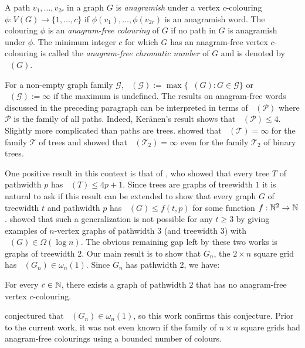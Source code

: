\documentclass{patmorin}
\DeclareMathOperator{\afcn}{\dot{\chi}_\pi}
\begin{document}
A path $v_1,\ldots,v_{2r}$ in a graph $G$ is \emph{anagramish} under a vertex $c$-colouring $\phi:V(G)\to\{1,\ldots,c\}$ if $\phi(v_1),\ldots,\phi(v_{2r})$ is an anagramish word.  The colouring $\phi$ is an \emph{anagram-free colouring} of $G$ if no path in $G$ is anagramish under $\phi$.  The minimum integer $c$ for which $G$ has an anagram-free vertex $c$-colouring is called the \emph{anagram-free chromatic number} of $G$ and is denoted by $\afcn(G)$.

For a non-empty graph family $\mathcal{G}$, $\afcn(\mathcal{G}):=\max\{\afcn(G):G\in\mathcal{G}\}$ or $\afcn(\mathcal{G}):=\infty$ if the maximum is undefined. The results on anagram-free words discussed in the preceding paragraph can be interpreted in terms of $\afcn(\mathcal{P})$ where $\mathcal{P}$ is the family of all paths. Indeed, Ker\"anen's result shows that $\afcn(\mathcal{P})\le 4$. Slightly more complicated than paths are trees.  \citet{wilson.wood:anagram-free} showed that $\afcn(\mathcal{T})=\infty$ for the family $\mathcal{T}$ of trees and \citet{kamcev.luczak.ea:anagram-free} showed that $\afcn(\mathcal{T}_2)=\infty$ even for the family $\mathcal{T}_2$ of binary trees.

One positive result in this context is that of
\citet{wilson.wood:anagram-free}, who showed that every tree $T$ of pathwidth $p$ has $\afcn(T)\le 4p+1$. Since trees are graphs of treewidth $1$ it is natural to ask if this result can be extended to show that every graph $G$ of treewidth $t$ and pathwidth $p$ has $\afcn(G)\le f(t,p)$ for some function $f:\mathbb{N}^2\to\mathbb{N}$.  \citet{carmi.dujmovic.ea:anagram-free} showed that such a generalization is not possible for any $t\ge 3$ by giving examples of $n$-vertex graphs of pathwidth $3$ (and treewidth $3$) with $\afcn(G)\in\Omega(\log n)$.  The obvious remaining gap left by these two works is graphs of treewidth $2$. Our main result is to show that $G_n$, the $2\times n$ square grid has $\afcn(G_n)\in\omega_n(1)$. Since $G_n$ has pathwidth 2, we have:

\begin{thm}\label{main_vertex}
    For every $c\in\mathbb{N}$, there exists a graph of pathwidth $2$ that has no anagram-free vertex $c$-colouring.
\end{thm}

\citet[Section 7.1]{wilson:anagram-free} conjectured that $\afcn(G_n)\in\omega_n(1)$, so this work confirms this conjecture.  Prior to the current work, it was not even known if the family of $n\times n$ square grids had anagram-free colourings using a bounded number of colours.
\end{document}
